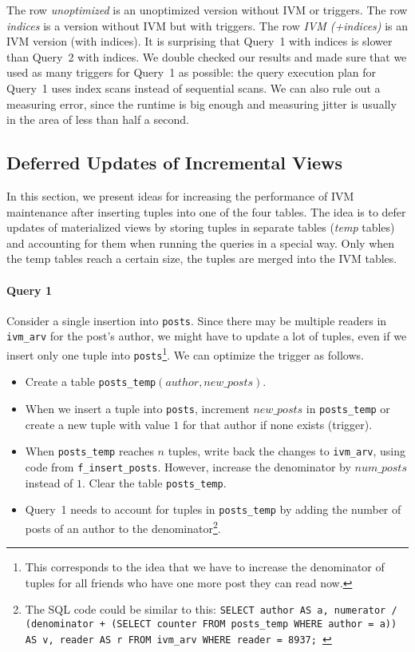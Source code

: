 \documentclass[12pt]{article}
\begin{document}
The row \emph{unoptimized} is an unoptimized version without IVM or triggers. The row \emph{indices} is a version without IVM but with triggers. The row \emph{IVM (+indices)} is an IVM version (with indices). It is surprising that Query~1 with indices is slower than Query~2 with indices. We double checked our results and made sure that we used as many triggers for Query~1 as possible: the query execution plan for Query~1 uses index scans instead of sequential scans. We can also rule out a measuring error, since the runtime is big enough and measuring jitter is usually in the area of less than half a second.

\subsection{Deferred Updates of Incremental Views}
In this section, we present ideas for increasing the performance of IVM maintenance after inserting tuples into one of the four tables. The idea is to defer updates of materialized views by storing tuples in separate tables (\emph{temp} tables) and accounting for them when running the queries in a special way. Only when the temp tables reach a certain size, the tuples are merged into the IVM tables.

\paragraph{Query 1}
Consider a single insertion into \lstinline{posts}. Since there may be multiple readers in \lstinline{ivm_arv} for the post's author, we might have to update a lot of tuples, even if we insert only one tuple into \lstinline{posts}\footnote{This corresponds to the idea that we have to increase the denominator of tuples for all friends who have one more post they can read now.}. We can optimize the trigger as follows.

\begin{itemize}
	\item Create a table \lstinline{posts_temp}$(\mathit{author}, \mathit{new\_posts})$.
    \item When we insert a tuple into \lstinline{posts}, increment $\mathit{new\_posts}$ in \lstinline{posts_temp} or create a new tuple with value $1$ for that author if none exists (trigger).
    \item When \lstinline{posts_temp} reaches $n$ tuples, write back the changes to \lstinline{ivm_arv}, using code from \lstinline{f_insert_posts}. However, increase the denominator by $\mathit{num\_posts}$ instead of $1$. Clear the table \lstinline{posts_temp}.
   \item Query~1 needs to account for tuples in \lstinline{posts_temp} by adding the number of posts of an author to the denominator\footnote{The SQL code could be similar to this: \lstinline!SELECT author AS a, numerator / (denominator + (SELECT counter FROM posts_temp WHERE author = a)) AS v, reader AS r FROM ivm_arv WHERE reader = 8937;
!}.
\end{itemize}
\end{document}
